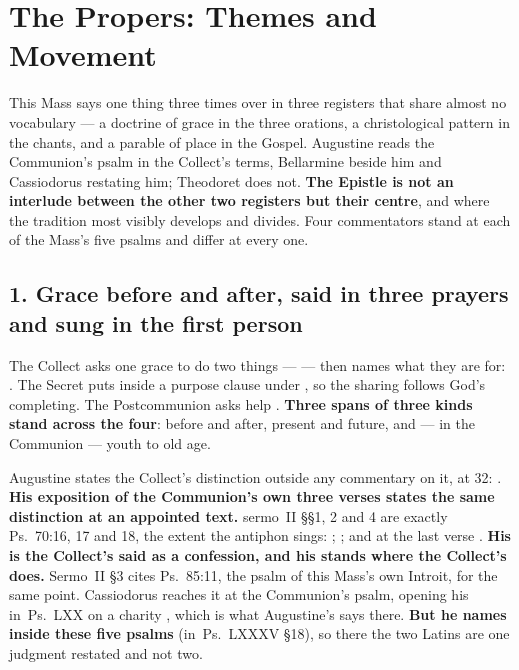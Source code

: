 \sectionguard
\section*{The Propers: Themes and Movement}
\label{triptych:brief-synthesis:start}

This Mass says one thing three times over in three registers that share almost
no vocabulary --- a doctrine of grace in the three orations, a christological
pattern in the chants, and a parable of place in the Gospel. Augustine reads the
Communion's psalm in the Collect's terms, Bellarmine beside him and Cassiodorus
restating him; Theodoret does not. \textbf{The Epistle is not an interlude
between the other two registers but their centre}, and where the tradition most
visibly develops and divides. Four commentators stand at each of the Mass's five
psalms and differ at every one.

\subsection*{1. Grace before and after, said in three prayers and sung in the first person}

The Collect asks one grace to do two things ---  --- then names what they are for: . The Secret puts  inside a purpose clause
under , so the sharing follows God's completing.
The Postcommunion asks help . \textbf{Three
spans of three kinds stand across the four}: before and after, present and
future, and --- in the Communion --- youth to old age.

Augustine states the Collect's distinction outside any commentary on it, at
 32: . \textbf{His exposition of the Communion's own
three verses states the same distinction at an appointed text.} 
sermo~II §§1, 2 and 4 are exactly Ps.~70:16, 17 and 18, the extent the antiphon
sings: ; ; and at the last verse .
\textbf{His  is the Collect's 
said as a confession, and his  stands where the Collect's does.}
Sermo~II §3 cites Ps.~85:11, the psalm of this Mass's own Introit, for the same
point. Cassiodorus reaches it at the Communion's psalm, opening his in~Ps.~LXX
on a charity , which is what Augustine's  says there. \textbf{But he names  inside these five
psalms} (in~Ps.~LXXXV \S18), so there the two Latins are one judgment restated
and not two.

